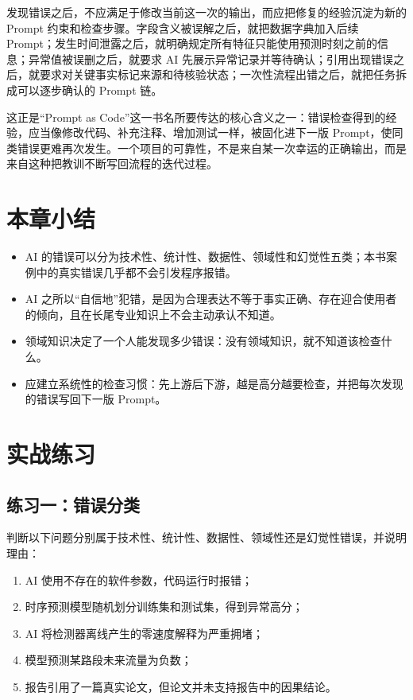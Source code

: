 发现错误之后，不应满足于修改当前这一次的输出，而应把修复的经验沉淀为新的 Prompt 约束和检查步骤。字段含义被误解之后，就把数据字典加入后续 Prompt；发生时间泄露之后，就明确规定所有特征只能使用预测时刻之前的信息；异常值被误删之后，就要求 AI 先展示异常记录并等待确认；引用出现错误之后，就要求对关键事实标记来源和待核验状态；一次性流程出错之后，就把任务拆成可以逐步确认的 Prompt 链。

这正是“Prompt as Code”这一书名所要传达的核心含义之一：错误检查得到的经验，应当像修改代码、补充注释、增加测试一样，被固化进下一版 Prompt，使同类错误更难再次发生。一个项目的可靠性，不是来自某一次幸运的正确输出，而是来自这种把教训不断写回流程的迭代过程。

\section{本章小结}

\begin{itemize}
  \item AI 的错误可以分为技术性、统计性、数据性、领域性和幻觉性五类；本书案例中的真实错误几乎都不会引发程序报错。
  \item AI 之所以“自信地”犯错，是因为合理表达不等于事实正确、存在迎合使用者的倾向，且在长尾专业知识上不会主动承认不知道。
  \item 领域知识决定了一个人能发现多少错误：没有领域知识，就不知道该检查什么。
  \item 应建立系统性的检查习惯：先上游后下游，越是高分越要检查，并把每次发现的错误写回下一版 Prompt。
\end{itemize}

\section{实战练习}

\subsection*{练习一：错误分类}

判断以下问题分别属于技术性、统计性、数据性、领域性还是幻觉性错误，并说明理由：

\begin{enumerate}
  \item AI 使用不存在的软件参数，代码运行时报错；
  \item 时序预测模型随机划分训练集和测试集，得到异常高分；
  \item AI 将检测器离线产生的零速度解释为严重拥堵；
  \item 模型预测某路段未来流量为负数；
  \item 报告引用了一篇真实论文，但论文并未支持报告中的因果结论。
\end{enumerate}


